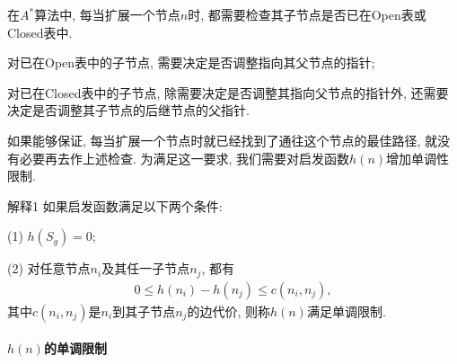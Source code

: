 在$A^*$算法中, 每当扩展一个节点$n$时, 都需要检查其子节点是否已在Open表或Closed表中.

对已在Open表中的子节点, 需要决定是否调整指向其父节点的指针;

对已在Closed表中的子节点, 除需要决定是否调整其指向父节点的指针外, 还需要决定是否调整其子节点的后继节点的父指针.

如果能够保证, 每当扩展一个节点时就已经找到了通往这个节点的最佳路径, 就没有必要再去作上述检查.
为满足这一要求, 我们需要对启发函数$h(n)$增加单调性限制.

\begin{mydef}{解释}{1}
如果启发函数满足以下两个条件:

(1) $h(S_g)=0$;

(2) 对任意节点$n_i$及其任一子节点$n_j$, 都有
\begin{align}
  0\leq h(n_i)-h(n_j)\leq c(n_i, n_j),
\end{align}
其中$c(n_i, n_j)$是$n_i$到其子节点$n_j$的边代价, 则称$h(n)$满足单调限制.
\end{mydef}
\paragraph{$h(n)$的单调限制}~{}

